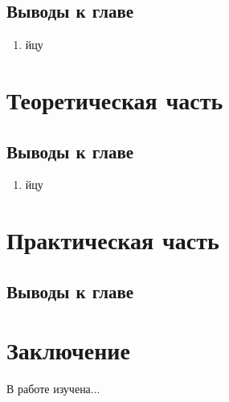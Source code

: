 \documentclass[a4paper,14pt]{article}
\begin{document}
    \subsection{Выводы к главе \thesection}
    \begin{enumerate}
        [1)]
        \itemsep0em
        \item йцу
    \end{enumerate}

    \newpage


    \section{Теоретическая часть}

    \subsection{Выводы к главе \thesection}
    \begin{enumerate}
        [1)]
        \itemsep0em
        \item йцу
    \end{enumerate}

    \newpage


    \section{Практическая часть}

    \subsection{Выводы к главе \thesection}



    \newpage


    \section{Заключение}

    В работе изучена...

    \newpage
    \renewcommand{\refname}{{\normalsize \hfill Список использованных источников \hfill}}
%    
    
    
    \newpage
\end{document}
